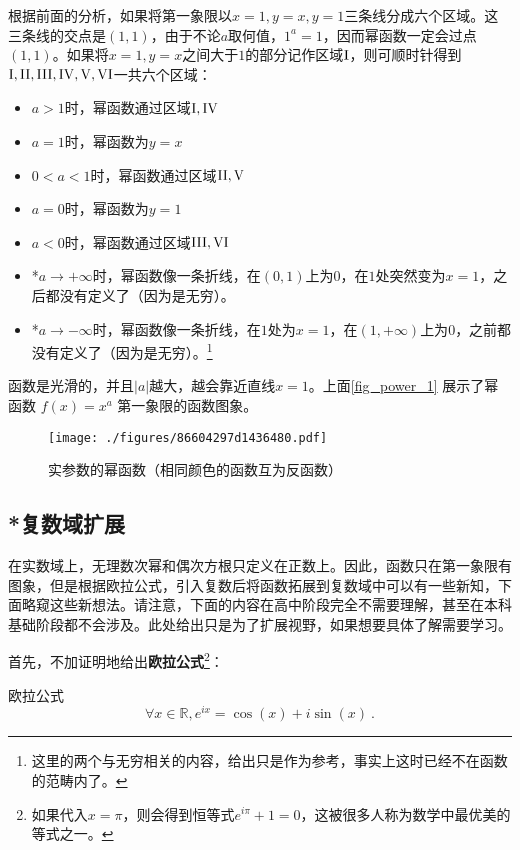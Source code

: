 根据前面的分析，如果将第一象限以$x=1,y=x,y=1$三条线分成六个区域。这三条线的交点是$(1,1)$，由于不论$a$取何值，$1^a=1$，因而幂函数一定会过点$(1,1)$。如果将$x=1,y=x$之间大于$1$的部分记作区域$\rm{I}$，则可顺时针得到$\rm{I, II, III, IV, V, VI}$一共六个区域：
\begin{itemize}
\item $a>1$时，幂函数通过区域$\rm{I,IV}$
\item $a=1$时，幂函数为$y=x$
\item $0<a<1$时，幂函数通过区域$\rm{II,V}$
\item $a=0$时，幂函数为$y=1$
\item $a<0$时，幂函数通过区域$\rm{III,VI}$
\item *$a\to+\infty$时，幂函数像一条折线，在$(0,1)$上为$0$，在$1$处突然变为$x=1$，之后都没有定义了（因为是无穷）。
\item *$a\to-\infty$时，幂函数像一条折线，在$1$处为$x=1$，在$(1,+\infty)$上为$0$，之前都没有定义了（因为是无穷）。\footnote{这里的两个与无穷相关的内容，给出只是作为参考，事实上这时已经不在函数的范畴内了。}
\end{itemize}
函数是光滑的，并且$|a|$越大，越会靠近直线$x=1$。上面\autoref{fig_power_1} 展示了幂函数 $f(x) = x^a$ 第一象限的函数图象。

\begin{figure}[ht]
\centering
\texttt{[image: ./figures/86604297d1436480.pdf]}
\caption{实参数的幂函数（相同颜色的函数互为反函数）}\label{fig_power_1}
\end{figure}


\subsection{*复数域扩展}


在实数域上，无理数次幂和偶次方根只定义在正数上。因此，函数只在第一象限有图象，但是根据欧拉公式，引入复数后将函数拓展到复数域中可以有一些新知，下面略窥这些新想法。请注意，下面的内容在高中阶段完全不需要理解，甚至在本科基础阶段都不会涉及。此处给出只是为了扩展视野，如果想要具体了解需要学习。

首先，不加证明地给出\textbf{欧拉公式}\footnote{如果代入$x=\pi$，则会得到恒等式$e^{i\pi}+1=0$，这被很多人称为数学中最优美的等式之一。}：

\begin{theorem}{欧拉公式}
\begin{equation}
\forall x\in\mathbb{R},e^{ix} = \cos(x) + i\sin(x)~.
\end{equation}
\end{theorem}

